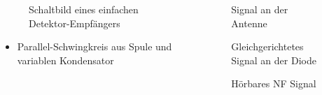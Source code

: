 \begin{frame}
\begin{columns}
    \begin{column}{0.48\textwidth}
    
\begin{figure}
    \caption{\scriptsize Schaltbild eines einfachen Detektor-Empfängers}
    \label{am_detektor}
\end{figure}

\begin{itemize}
  \item Parallel-Schwingkreis aus Spule und variablen Kondensator
  \end{itemize}

    \end{column}
   \begin{column}{0.48\textwidth}
       
\begin{figure}
    \caption{\scriptsize Signal an der Antenne}
    \label{am_detektor_antenne}
\end{figure}


\begin{figure}
    \caption{\scriptsize Gleichgerichtetes Signal an der Diode}
    \label{am_detektor_diode}
\end{figure}


\begin{figure}
    \caption{\scriptsize Hörbares NF Signal}
    \label{am_detektor_kopfhoerer}
\end{figure}


   \end{column}
\end{columns}

\end{frame}

